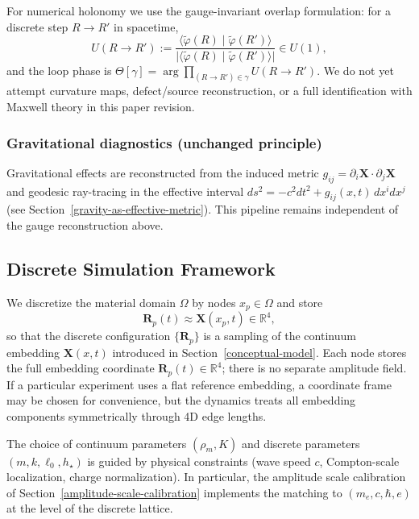For numerical holonomy we use the gauge-invariant overlap formulation: for a discrete step
$R\to R'$ in spacetime,
\begin{equation}
  U(R\to R') :=
  \frac{\langle \tilde \varphi(R)\mid \tilde \varphi(R')\rangle}
       {\big|\langle \tilde \varphi(R)\mid \tilde \varphi(R')\rangle\big|}\in U(1),
\end{equation}
and the loop phase is $\Theta[\gamma]=\arg\prod_{(R\to R')\in\gamma} U(R\to R')$.
We do not yet attempt curvature maps, defect/source reconstruction, or a full identification
with Maxwell theory in this paper revision.

\subsubsection{Gravitational diagnostics (unchanged principle)}

Gravitational effects are reconstructed from the induced metric
$g_{ij} = \partial_i \mathbf X \cdot \partial_j \mathbf X$ and geodesic
ray-tracing in the effective interval
$ds^2 = -c^2 dt^2 + g_{ij}(x,t) \, dx^i dx^j$
(see Section~\ref{gravity-as-effective-metric}). This pipeline remains
independent of the gauge reconstruction above.

\subsection{Discrete Simulation Framework}\label{discrete-simulation-framework}

We discretize the material domain $\Omega$ by nodes $x_p\in\Omega$ and store
\begin{equation}\label{eq:discrete-embedding}
  \mathbf R_p(t) \approx \mathbf X(x_p,t)\in\mathbb R^4,
\end{equation}
so that the discrete configuration $\{\mathbf R_p\}$ is a sampling of the continuum embedding
$\mathbf X(x,t)$ introduced in Section~\ref{conceptual-model}.
Each node stores the full embedding coordinate $\mathbf R_p(t)\in\mathbb R^4$; there is no separate amplitude field.
If a particular experiment uses a flat reference embedding, a coordinate frame may be chosen for convenience, but the
dynamics treats all embedding components symmetrically through 4D edge lengths.

The choice of continuum parameters $(\rho_m,K)$ and discrete parameters $(m,k,\ell_0,h_\star)$
is guided by physical constraints (wave speed $c$, Compton-scale localization,
charge normalization). In particular, the amplitude scale calibration
of Section~\ref{amplitude-scale-calibration} implements the matching to
$(m_e,c,\hbar,e)$ at the level of the discrete lattice.


